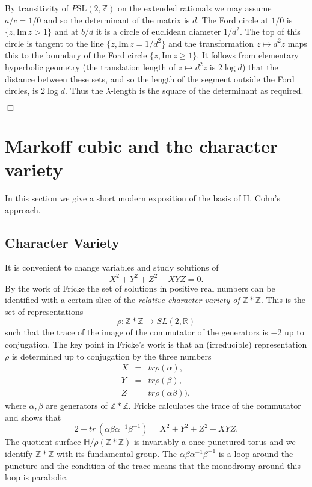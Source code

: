 \documentclass[12pt,a4paper]{amsart}
\def\HH{\mathbb{H}}
\def\im{\mathrm{Im}\,}
\def\ZZ{\mathbb{Z}}
\def\RR{\mathbb{R}}
\def\sl2{\mathrm{SL}(2, \ZZ)}
\begin{document}
\proof By transitivity of $P\sl2$ on the extended rationals we may assume $a/c =
1/0$ and so the determinant of the matrix is $d$. The Ford circle at $1/0$  is
$\{ z, \im z > 1\}$ and at $b/d$ it is a circle of euclidean diameter $1/d^2$.
The top of this circle is tangent to the line $\{ z, \im z = 1/d^2\}$ and the
transformation $z \mapsto d^2 z $ maps this to the boundary of the Ford circle
$\{ z, \im z \geq 1\}$. It follows from elementary hyperbolic geometry (the
translation length of $z \mapsto d^2 z$ is $2\log d$) that the distance between
these sets, and so the length of the segment outside the Ford circles, is
$2\log d$. Thus the $\lambda$-length is the square of the determinant as
required.

\hfill $\Box$

 
\section{Markoff cubic and the character variety}

In this section we give a short modern exposition of the basis of H. Cohn's
approach.

\subsection{Character Variety}

It is convenient to change variables and study solutions of
\begin{equation}\label{f cubic}
X^2 + Y^2 + Z^2 - XYZ = 0.
\end{equation}
By the work of Fricke the set of solutions in positive real numbers
can be identified with a certain slice of the 
\textit{relative character variety of $\ZZ * \ZZ$}.
This is the set of  representations 
$$\rho: \ZZ * \ZZ \rightarrow SL(2, \RR)$$
such that the trace of the image of the commutator of the generators is $-2$
up to conjugation.
The key point in Fricke's work is that an (irreducible) representation $\rho$
is determined up to conjugation by the three numbers
\begin{eqnarray*}
X &= &tr \rho(\alpha), \\
Y  &= &tr \rho(\beta), \\
Z &= & tr \rho(\alpha\beta)),
\end{eqnarray*}
where $\alpha,\beta$ are generators of $\ZZ*\ZZ$.
Fricke calculates the trace of the commutator and shows that
\begin{equation}
2 + tr\,  (\alpha\beta\alpha^{-1}\beta^{-1}) = X^2 + Y^2 + Z^2 - XYZ .
\end{equation}
The quotient surface $\HH/\rho(\ZZ*\ZZ)$ is invariably a once punctured torus
and we identify $\ZZ * \ZZ$ with its fundamental group.
The $\alpha\beta\alpha^{-1}\beta^{-1}$ is a loop around the puncture
and the condition of the trace means that the monodromy around this loop is parabolic.
\end{document}
